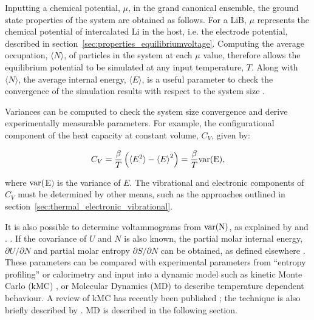 \documentclass[../main.tex]{subfiles}
\begin{document}
Inputting a chemical potential, $\mu$, in the grand canonical ensemble, the ground state properties of the system are obtained as follows. For a LiB, $\mu$ represents the chemical potential of intercalated Li in the host, i.e. the electrode potential, described in section~\ref{sec:properties_equilibriumvoltage}. Computing the average occupation, $\langle N \rangle$, of particles in the system at each $\mu$ value, therefore allows the equilibrium potential to be simulated at any input temperature, $T$. Along with $\langle N \rangle$, the average internal energy, $\langle{E}\rangle$, is a useful parameter to check the convergence of the simulation results with respect to the system size \cite{mercer_influence_2017,Binder2009book,Kim2001h,darling1999}.

Variances can be computed to check the system size convergence and derive experimentally measurable parameters. For example, the configurational component of the heat capacity at constant volume, $C_{V}$, given by:

\begin{equation}
    C_{V} = \frac{\beta}{T}\left(\langle{E^{2}}\rangle -{\langle{E}\rangle}^{2}\right) =  \frac{\beta}{T}\rm{var}(E),
    \label{eq:mc_heat_cap}
\end{equation}

where $\rm{var}($E$)$ is the variance of $E$. The vibrational and electronic components of $C_{V}$ must be determined by other means, such as the approaches outlined in section~\ref{sec:thermal_electronic_vibrational}. 

It is also possible to determine voltammograms from $\rm{var}(N)$, as explained by \citeauthor{darling1999} and \citeauthor{mercer_influence_2017}. \cite{darling1999,mercer_influence_2017}. If the covariance of $U$ and $N$ is also known, the partial molar internal energy, $\partial{U}/\partial{N}$ and partial molar entropy $\partial{S}/\partial{N}$ can be obtained, as defined elsewhere \cite{mercer_influence_2017,Kim2001h}. These parameters can be compared with experimental parameters from ``entropy profiling'' or calorimetry \cite{mercer_influence_2017,schlueter_quantifying_2018, Mercer2019,THOMAS2003844,zhang2017} and input into a dynamic model such as kinetic Monte Carlo (kMC) \cite{gavilan-arriazu_kinetic_2020,darling1999,gavilan-arriazu_effect_2020,persson2010}, or Molecular Dynamics (MD) to describe temperature dependent behaviour. A review of kMC has recently been published \cite{Gavil_n_Arriazu_2021_kmc}; the technique is also briefly described by \citeauthor{VanderVen2020}.\cite{VanderVen2020} MD is described in the following section.
\end{document}
